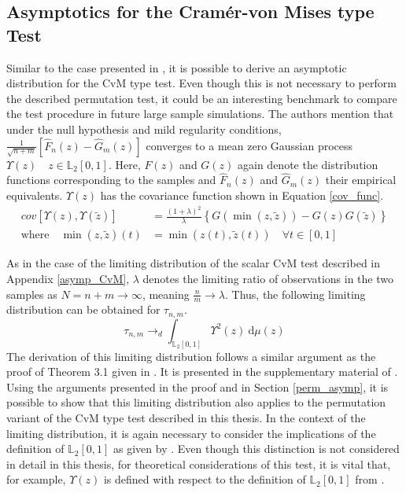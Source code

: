 \documentclass[12pt, a4paper]{article}
\theoremstyle{MAstyle} \newtheorem{assumption}{Assumption}[section]
\theoremstyle{MAstyle} \newtheorem{definition}{Definition}[section]
\theoremstyle{MAstyle} \newtheorem{theorem}{Theorem}[section]
\begin{document}
		\subsection{Asymptotics for the Cram\'{e}r-von Mises type Test}\label{asymp}
			Similar to the case presented in \cite{bugni_goodness--fit_2009}, it is possible to derive an asymptotic distribution for the CvM type test. Even though this is not necessary to perform the described permutation test, it could be an interesting benchmark to compare the test procedure in future large sample simulations. The authors mention that under the null hypothesis and mild regularity conditions, $\frac{1}{\sqrt{n+m}}\left[\hat{F}_n(z) - \hat{G}_m(z)\right]$ converges to a mean zero Gaussian process $\Upsilon(z) \quad z \in \mathbb{L}_2[0,1]$. Here, $F(z)$ and $G(z)$ again denote the distribution functions corresponding to the samples and $\hat{F}_n(z)$ and $\hat{G}_m(z)$ their empirical equivalents. $\Upsilon(z)$ has the covariance function shown in Equation \ref{cov_func}. 
			\begin{equation}\label{cov_func}
				\begin{split}
					\textit{cov}\left[\Upsilon(z), \Upsilon(\tilde{z})\right] &= \frac{(1 + \lambda)^2}{\lambda}\left\{G(\min\left(z, \tilde{z}\right)) - G(z)G(\tilde{z})\right\} \\
					\text{where} \quad \min(z, \tilde{z})(t) &= \min\left(z(t), \tilde{z}(t)\right) \quad \forall t \in [0,1]
				\end{split}
			\end{equation}
		
			As in the case of the limiting distribution of the scalar CvM test described in Appendix \ref{asymp_CvM}, $\lambda$ denotes the limiting ratio of observations in the two samples as $N = n+m \rightarrow \infty$, meaning $\frac{n}{m} \rightarrow \lambda$. 
			Thus, the following limiting distribution can be obtained for $\tau_{n,m}$.
			\begin{equation}
				\tau_{n,m} \rightarrow_d \int_{\mathbb{L}_2[0,1]}\Upsilon^2(z) \ \mathrm{d}\mu(z)
			\end{equation}
			The derivation of this limiting distribution follows a similar argument as the proof of Theorem 3.1 given in \cite{bugni_goodness--fit_2009}. It is presented in the supplementary material of \cite{bugni_permutation_2021}.
			Using the arguments presented in the proof and in Section \ref{perm_asymp}, it is possible to show that this limiting distribution also applies to the permutation variant of the CvM type test described in this thesis.
			In the context of the limiting distribution, it is again necessary to consider the implications of the definition of $\mathbb{L}_2[0,1]$ as given by \cite{bugni_permutation_2021}. Even though this distinction is not considered in detail in this thesis, for theoretical considerations of this test, it is vital that, for example, $\Upsilon(z)$ is defined with respect to the definition of $\mathbb{L}_2[0,1]$ from \cite{bugni_permutation_2021}.
		
\end{document}
